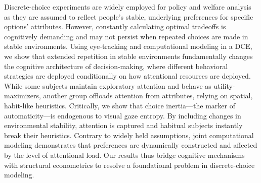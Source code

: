 Discrete-choice experiments are widely employed for policy and welfare analysis as they are assumed to reflect people's stable, underlying preferences for specific options' attributes. However, constantly calculating optimal tradeoffs is cognitively demanding and may not persist when repeated choices are made in stable environments. Using eye-tracking and computational modeling in a DCE, we show that extended repetition in stable environments fundamentally changes the cognitive architecture of decision-making, where different behavioral strategies are deployed conditionally on how attentional resources are deployed. While some subjects maintain exploratory attention and behave as utility-maximizers, another group offloads attention from attributes, relying on spatial, habit-like heuristics. Critically, we show that choice inertia---the marker of automaticity---is endogenous to visual gaze entropy. By including changes in environmental stability, attention is captured and habitual subjects instantly break their heuristics. Contrary to widely held assumptions, joint computational modeling demonstrates that preferences are dynamically constructed and affected by the level of attentional load. Our results thus bridge cognitive mechanisms with structural econometrics to resolve a foundational problem in discrete-choice modeling.

